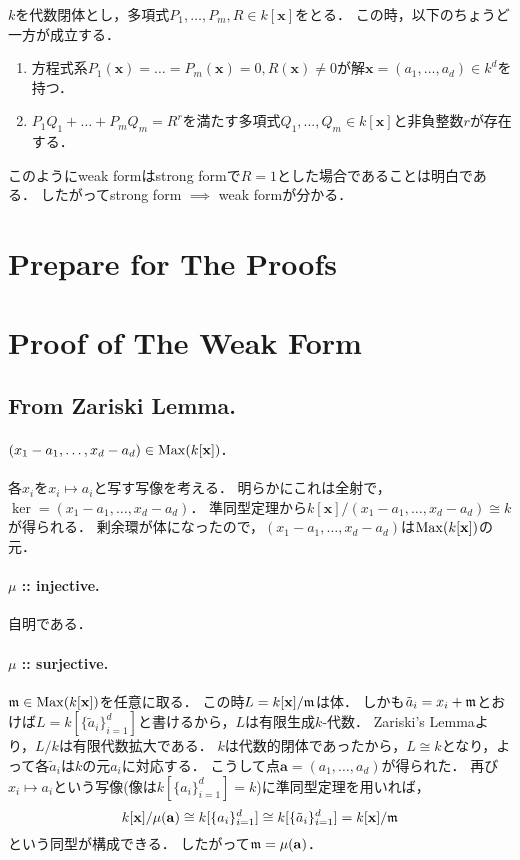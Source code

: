 \documentclass[a4paper]{jsarticle}
\newcommand{\kx}{k[\mathbf{x}]}
\begin{document}
    \begin{Them}
        $k$を代数閉体とし，多項式$P_1, \dots, P_m, R\in \kx$をとる．
        この時，以下のちょうど一方が成立する．
        \begin{enumerate}[1.]
            \item 方程式系$P_1(\mathbf{x})=\ldots=P_m(\mathbf{x})=0, R(\mathbf{x}) \neq 0$が解$\mathbf{x}=(a_1, \dots, a_d) \in k^d$を持つ．
            \item$P_1 Q_1 + \ldots + P_m Q_m=R^r$を満たす多項式$Q_1,\ldots,Q_m \in \kx$と非負整数$r$が存在する．
        \end{enumerate}
    \end{Them}
    このようにweak formはstrong formで$R=1$とした場合であることは明白である．
    したがってstrong form $\implies$ weak formが分かる．

\section{Prepare for The Proofs}
    
    

\section{Proof of The Weak Form}
    \subsection{From Zariski Lemma.}
    \paragraph{$(x_1-a_1, \dots, x_d-a_d) \in \Max(\kx)$.}
    各$x_i$を$x_i \mapsto a_i$と写す写像を考える．
    明らかにこれは全射で，$\ker = (x_1-a_1, \dots, x_d-a_d)$．
    準同型定理から$\kx/(x_1-a_1, \dots, x_d-a_d) \cong k$が得られる．
    剰余環が体になったので，$(x_1-a_1, \dots, x_d-a_d)$は$\Max(\kx)$の元．

    \paragraph{$\mu$ :: injective.}
    自明である．

    \paragraph{$\mu$ :: surjective.}
    $\I{m} \in \Max(\kx)$を任意に取る．
    この時$L=\kx/\I{m}$は体．
    しかも$\tilde{a}_i=x_i+\mathfrak{m}$とおけば$L=k[\{\tilde{a}_i\}_{i=1}^d]$と書けるから，$L$は有限生成$k$-代数．
    Zariski's Lemmaより，$L/k$は有限代数拡大である．
    $k$は代数的閉体であったから，$L \cong k$となり，よって各$\tilde{a}_i$は$k$の元$a_i$に対応する．
    こうして点$\mathbf{a}=(a_1,\dots,a_d)$が得られた．
    再び$x_i \mapsto a_i$という写像(像は$k[\{a_i\}_{i=1}^d]=k$)に準同型定理を用いれば，
    \[ \kx/\mu(\mathbf{a}) \cong k[\{a_i\}_{i=1}^d] \cong k[\{\tilde{a}_i\}_{i=1}^d]=\kx/\I{m} \]
    という同型が構成できる．
    したがって$\mathfrak{m}=\mu(\mathbf{a})$．
\end{document}
